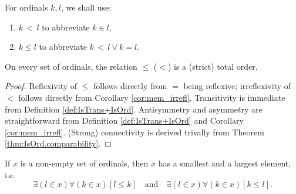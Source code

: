 \begin{definition}
    \label{def:Ord.lt+Ord.le}
    \leanok
    For ordinals $k,l$, we shall use:
    \begin{enumerate}
    \item $k\,<\,l$ to abbreviate $k \in l$,
    \item $k \leq l$ to abbreviate $k\,<\,l \lor k = l$.
    \end{enumerate}
\end{definition}

\begin{theorem}
    \label{thm:Ord.le_totalOrder+Ord.lt_sTotalOrder}
    \leanok
    On every set of ordinals, the relation $\leq$ ($<$) is a (strict) total order.
\end{theorem}

\begin{proof}
    \leanok
    Reflexivity of $\leq$ follows directly from $=$ being reflexive; 
    irreflexivity of $<$ follows directly from Corollary \ref{cor:mem_irrefl}.
    Transitivity is immediate from Definition \ref{def:IsTrans+IsOrd}.
    Antisymmetry and asymmetry are straightforward from Definition \ref{def:IsTrans+IsOrd} and
    Corollary \ref{cor:mem_irrefl}.
    (Strong) connectivity is derived trivally from Theorem \ref{thm:IsOrd.comparability}.
\end{proof}

\begin{theorem}
    \label{thm:IsOrd.exists_max_of_set+IsOrd.exists_min_of_set}
    \leanok
    If $x$ is a non-empty set of ordinals, then $x$ has a smallest and a largest element, 
    i.e.
    \begin{equation*}
    \exists(l \in x) \forall (k \in x) [l \leq k]\quad\text{and}\quad\exists(l \in x) 
    \forall (k \in x) [k \leq l].
    \end{equation*}
\end{theorem}

